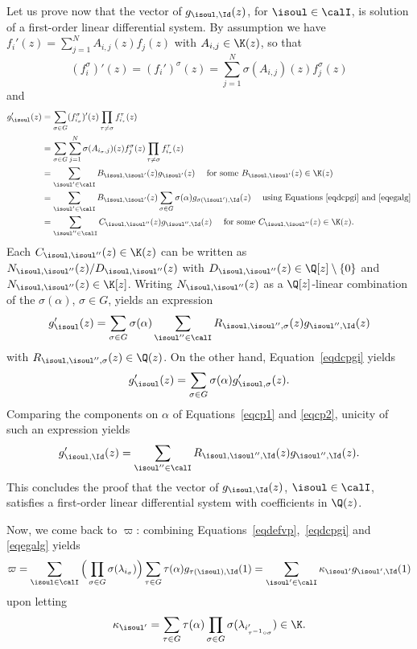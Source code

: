 Let us prove now that the vector of \Efunctions $g_{ \isoul ,\Id}(z)$, for $\isoul\in\calI$, is solution of a first-order linear differential system. By assumption we have $f_i'(z) = \sum_{j=1}^N A_{i,j}(z) f_j(z)$ with $A_{i,j}\in\K(z)$, so that
\[
(f_i^\sigma)'(z) = (f_i')^\sigma(z)=\sum_{j=1}^N \sigma(A_{i,j})(z) f_j^\sigma(z)
\]
and
\begin{align*}
g_\isoul '(z)
&=\sum_{\sigma\in G} ( f_{i_\sigma}^\sigma)'(z) \prod_{\tau\neq \sigma}
f_{i_\tau}^\tau (z)\\
&= \sum_{\sigma\in G} \sum_{j=1}^N \sigma(A_{i_\sigma,j})(z) f_j^\sigma(z)
\prod_{\tau\neq \sigma} f_{i_\tau}^\tau(z) \\
&= \sum_{\isoul' \in\calI } B_{\isoul,\isoul'}(z)g_{\isoul'}(z) \quad \mbox{ for some }
B_{\isoul,\isoul'}(z)\in\K(z)\\
&= \sum_{\isoul' \in\calI } B_{\isoul,\isoul'}(z) \sum_{\sigma\in G} \sigma(\alpha) g_{\sigma(\isoul'),\Id}(z) \quad \mbox{ using Equations~\eqref{eqdcpgi} and \eqref{eqegalg}}\\
&= \sum_{\isoul'' \in\calI } C_{\isoul,\isoul''}(z) g_{\isoul'',\Id}(z) \quad \mbox{ for some }
C_{\isoul,\isoul''}(z)\in\K(z).
\end{align*}
Each $C_{\isoul,\isoul''}(z)\in\K(z)$ can be written as $N_{\isoul,\isoul''}(z)/D_{\isoul,\isoul''}(z)$ with $D_{\isoul,\isoul''}(z)\in\Q[z]\setminus\{0\}$ and $N_{\isoul,\isoul''}(z)\in\K[z]$. Writing $N_{\isoul,\isoul''}(z)$ as a $\Q[z]$-linear combination of the $\sigma(\alpha)$, $\sigma\in G$, yields an expression
\begin{equation} \label{eqcp1}
g_\isoul '(z) = \sum_{\sigma\in G} \sigma(\alpha)\sum_{\isoul'' \in\calI } R_{\isoul,\isoul'',\sigma}(z) g_{\isoul'',\Id}(z)
\end{equation}
with $R_{\isoul,\isoul'',\sigma}(z) \in\Q(z) $. On the other hand, Equation~\eqref{eqdcpgi} yields
\begin{equation} \label{eqcp2}
g_\isoul '(z) = \sum_{\sigma\in G} \sigma(\alpha) g_{\isoul ,\sigma}'(z).
\end{equation}
Comparing the components on $\alpha$ of Equations~\eqref{eqcp1} and \eqref{eqcp2}, unicity of such an expression yields
\[
g_{\isoul ,\Id}'(z) = \sum_{\isoul'' \in\calI }R_{\isoul,\isoul'',\Id}(z) g_{\isoul'',\Id}(z) .
\]
This concludes the proof that the vector of \Efunctions $g_{ \isoul ,\Id}(z)$, $\isoul\in\calI$, satisfies a first-order linear differential system with coefficients in $\Q(z)$.

Now, we come back to $\varpi$: combining Equations~\eqref{eqdefvp},~\eqref{eqdcpgi} and \eqref{eqegalg} yields
\begin{equation} \label{eqdcpsurQ}
\varpi = \sum_{\isoul\in\calI} \Big( \prod_{\sigma\in G} \sigma(\lambda_{i_\sigma})\Big)
\sum_{\tau\in G}\tau(\alpha) g_{\tau(\isoul), \Id}(1) = \sum_{\isoul'\in\calI} \kappa_{\isoul'} g_{\isoul', \Id}(1)
\end{equation}
upon letting
\[
\kappa_{\isoul'} = \sum_{\tau\in G}\tau(\alpha)\prod_{\sigma\in G} \sigma(\lambda_{i'_{\tau^{-1}\circ\sigma}})\in\K.
\]

